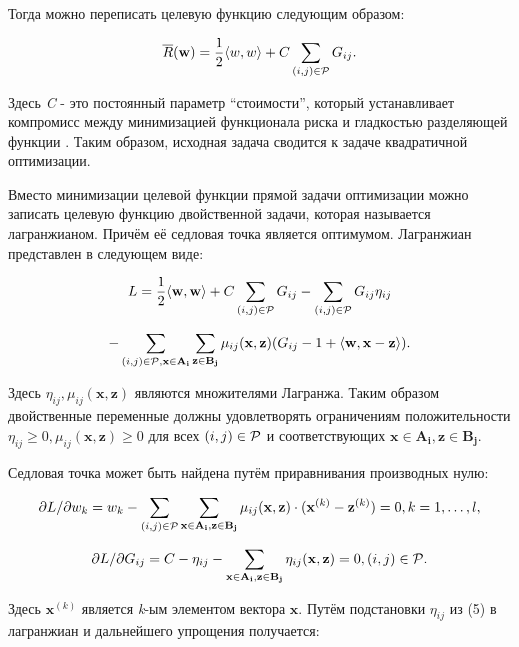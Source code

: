 \documentclass[12pt,a4paper,oneside]{article}
\begin{document}
\par
Тогда можно переписать целевую функцию следующим образом:

\[
\overline{R}(\mathbf{w}) = \frac{1}{2} \langle w, w \rangle + C \sum \limits_{(i, j) \in \mathcal{P}} G_{ij}. 
\]

\par
Здесь \emph{C} - это постоянный параметр ``стоимости'', который устанавливает компромисс между минимизацией функционала риска и гладкостью разделяющей функции . 
Таким образом, исходная задача сводится к задаче квадратичной оптимизации. 

\par
Вместо минимизации целевой функции прямой задачи оптимизации можно записать целевую функцию двойственной задачи, которая называется лагранжианом. 
Причём её седловая точка является оптимумом. 
Лагранжиан представлен в следующем виде:

\[
L = \frac{1}{2} \langle \mathbf{w}, \mathbf{w} \rangle + C \sum \limits_{(i, j) \in \mathcal{P}} G_{ij} - \sum \limits_{(i, j) \in \mathcal{P}} G_{ij} \eta_{ij}
\]

\[
- \sum \limits_{(i, j) \in \mathcal{P}, \mathbf{x} \in \mathbf{A_i}} \sum \limits_{\mathbf{z} \in \mathbf{B_j}} \mu_{ij}(\mathbf{x}, \mathbf{z}) (G_{ij} - 1 + \langle \mathbf{w}, \mathbf{x} - \mathbf{z} \rangle).
\]

\par
Здесь \(\eta_{ij}, \mu_{ij}(\mathbf{x}, \mathbf{z})\) являются множителями Лагранжа. 
Таким образом двойственные переменные должны удовлетворять ограничениям положительности \(\eta_{ij} \geq 0, \mu_{ij} (\mathbf{x}, \mathbf{z}) \geq 0\) для всех \((i, j) \in \mathcal{P}\) и соответствующих \(\mathbf{x} \in \mathbf{A_i}, \mathbf{z} \in \mathbf{B_j}\). 

\par
Седловая точка может быть найдена путём приравнивания производных нулю:

\[
\partial L / \partial w_k = w_k - \sum \limits_{(i, j) \in \mathcal{P}} \sum \limits_{\mathbf{x} \in \mathbf{A_i}, \mathbf{z} \in \mathbf{B_j}} \mu_{ij} (\mathbf{x}, \mathbf{z}) \cdot (\mathbf{x}^{(k)} - \mathbf{z}^{(k)}) = 0, k = 1, \dots, l,
\]

\[
\partial L / \partial G_{ij} = C - \eta_{ij} - \sum \limits_{\mathbf{x} \in \mathbf{A_i}, \mathbf{z} \in \mathbf{B_j}} \eta_{ij}(\mathbf{x}, \mathbf{z}) = 0, (i, j) \in \mathcal{P}. 
\]

\par
Здесь \(\mathbf{x}^{(k)}\) является \emph{k}-ым элементом вектора \(\mathbf{x}\). 
Путём подстановки \(\eta_{ij}\) из (5) в лагранжиан и дальнейшего упрощения получается:
\end{document}
